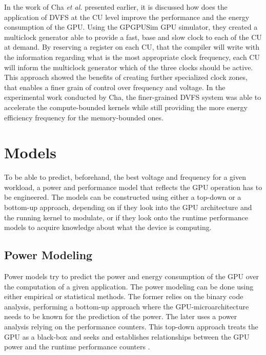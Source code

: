 In the work of Cha \textit{et al.} \cite{cha_core-level_2018} presented earlier, it is discussed how does the application of DVFS at the CU level improve the performance and the energy consumption of the GPU. Using the GPGPUSim GPU simulator, they created a multiclock generator able to provide a fast, base and slow clock to each of the CU at demand.  By reserving a register on each CU, that the compiler will write with the information regarding what is the most appropriate clock frequency, each CU will inform the multiclock generator which of the three clocks should be active. This approach showed the benefits of creating further specialized clock zones, that enables a finer grain of control over frequency and voltage. In the experimental work conducted by Cha, the finer-grained DVFS system was able to accelerate the compute-bounded kernels while still providing the more energy efficiency frequency for the memory-bounded ones.

\section{Models}
\label{section:Models}
To be able to predict, beforehand, the best voltage and frequency for a given workload, a power and performance model that reflects the GPU operation has to be engineered. The models can be constructed using either a top-down or a bottom-up approach, depending on if they look into the GPU architecture and the running kernel to modulate, or if they look onto the runtime performance models to acquire knowledge about what the device is computing.

\subsection{Power Modeling}
\label{subsection:powermodels}

Power models try to predict the power and energy consumption of the GPU over the computation of a given application. The power modeling can be done using either empirical or statistical methods. The former relies on the binary code analysis, performing a bottom-up approach where the GPU-microarchitecture needs to be known for the prediction of the power. The later uses a power analysis relying on the performance counters. This top-down approach treats the GPU as a black-box and seeks and establishes relationships between the GPU power and the runtime performance counters \cite{mei_survey_2016}.

